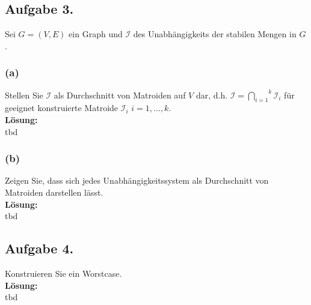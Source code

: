 \documentclass[11pt,a4paper,ngerman]{article}
\begin{document}
\subsection*{Aufgabe 3.}

Sei $G = (V,E)$ ein Graph und $\mathcal{I}$ des Unabhängigkeits der stabilen Mengen in $G$.

\subsubsection*{(a)}
Stellen Sie $\mathcal{I}$ als Durchschnitt von Matroiden auf $V$ dar, d.h. 
$\mathcal{I} = \overset{k}{\underset{i=1}{\bigcap}} \mathcal{I}_i$ für
geeignet konstruierte Matroide $\mathcal{I}_i$ $i = 1, ..., k$.\\

\textbf{Lösung:}\\

tbd


\subsubsection*{(b)}
Zeigen Sie, dass sich jedes Unabhängigkeitssystem als Durchschnitt von Matroiden
darstellen lässt.\\

\textbf{Lösung:}\\

tbd


\subsection*{Aufgabe 4.}
Konstruieren Sie ein Worstcase.\\

\textbf{Lösung:}\\

tbd

\label{LastPage}
\end{document}
